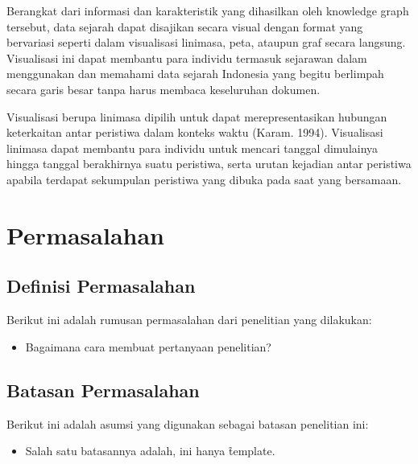 Berangkat dari informasi dan karakteristik yang dihasilkan oleh knowledge graph tersebut, data sejarah dapat disajikan secara visual dengan format yang bervariasi seperti dalam visualisasi linimasa, peta, ataupun graf secara langsung. Visualisasi ini dapat membantu para individu termasuk sejarawan dalam menggunakan dan memahami data sejarah Indonesia yang begitu berlimpah secara garis besar tanpa harus membaca keseluruhan dokumen.

Visualisasi berupa linimasa dipilih untuk dapat merepresentasikan hubungan keterkaitan antar peristiwa dalam konteks waktu (Karam. 1994). Visualisasi linimasa dapat membantu para individu untuk mencari tanggal dimulainya hingga tanggal berakhirnya suatu peristiwa, serta urutan kejadian antar peristiwa apabila terdapat sekumpulan peristiwa yang dibuka pada saat yang bersamaan.

\noindent{}


\section{Permasalahan}
\label{sec:masalah}
\noindent{}

\subsection{Definisi Permasalahan}
\label{sec:definisiMasalah}
Berikut ini adalah rumusan permasalahan dari penelitian yang dilakukan:
\begin{itemize}
	\item Bagaimana cara membuat pertanyaan penelitian?
\end{itemize}
\noindent{}

\subsection{Batasan Permasalahan}
\label{sec:batasanMasalah}
Berikut ini adalah asumsi yang digunakan sebagai batasan penelitian ini:
\begin{itemize}
	\item Salah satu batasannya adalah, ini hanya \f{template}.
\end{itemize}

